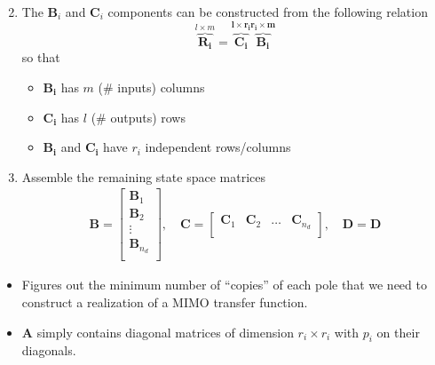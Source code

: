\begin{enumerate}
\begin{equation*}
          \end{equation*}
    \item The $\mathbf{B}_i$ and $\mathbf{C}_i$ components can be constructed from the following relation
          \begin{equation*}
              \overbrace{\mathbf{R_i}}^{l\times m}=\mathbf{\overbrace{\mathbf{C}_i}^{l\times r_i}\overbrace{ \mathbf{B}_i}^{r_i \times m}}
          \end{equation*}
          so that
          \begin{itemize}
              \item $\mathbf{B_i}$ has $m$ (\# inputs) columns
              \item $\mathbf{C_i}$ has $l$ (\# outputs) rows
              \item $\mathbf{B_i}$ and $\mathbf{C_i}$ have $r_i$ independent rows/columns
          \end{itemize}
    \item Assemble the remaining state space matrices
          \begin{gather*}
              \mathbf{B}  =\begin{bmatrix}
                  \mathbf{B}_1     \\
                  \mathbf{B}_2     \\
                  \vdots           \\
                  \mathbf{B}_{n_d} \\
              \end{bmatrix}, \quad
              \mathbf{C}  =\begin{bmatrix}
                  \mathbf{C}_1 & \mathbf{C}_2 & \dots & \mathbf{C}_{n_d} \\
              \end{bmatrix}, \quad
              \mathbf{D} = \mathbf{D}
          \end{gather*}
\end{enumerate}


\begin{itemize}
    \item Figures out the minimum number of ``copies'' of each pole that we need to construct a realization of a MIMO transfer function.
    \item $\mathbf{A}$ simply contains diagonal matrices of dimension $r_i \times r_i$ with $p_i$ on their diagonals.
\end{itemize}

